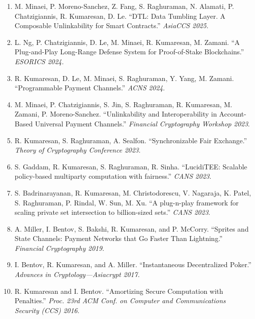 \documentclass[11pt]{article}
\begin{document}
\begin{enumerate}[leftmargin=*, itemsep=1pt]
    \item M. Minaei, P. Moreno-Sanchez, Z. Fang, S. Raghuraman, N. Alamati, P. Chatzigiannis, R. Kumaresan, D. Le. ``DTL: Data Tumbling Layer. A Composable Unlinkability for Smart Contracts.'' \textit{AsiaCCS 2025.}
    
    \item L. Ng, P. Chatzigiannis, D. Le, M. Minaei, R. Kumaresan, M. Zamani. ``A Plug-and-Play Long-Range Defense System for Proof-of-Stake Blockchains.'' \textit{ESORICS 2024.}
    
    \item R. Kumaresan, D. Le, M. Minaei, S. Raghuraman, Y. Yang, M. Zamani. ``Programmable Payment Channels.'' \textit{ACNS 2024}.
    
    \item M. Minaei, P. Chatzigiannis, S. Jin, S. Raghuraman, R. Kumaresan, M. Zamani, P. Moreno-Sanchez. ``Unlinkability and Interoperability in Account-Based Universal Payment Channels.'' \textit{Financial Cryptography Workshop 2023}.
    
    \item R. Kumaresan, S. Raghuraman, A. Sealfon. ``Synchronizable Fair Exchange.'' \textit{Theory of Cryptography Conference 2023}.
    
    \item S. Gaddam, R. Kumaresan, S. Raghuraman, R. Sinha. ``LucidiTEE: Scalable policy-based multiparty computation with fairness.'' \textit{CANS 2023}.
    
    \item S. Badrinarayanan, R. Kumaresan, M. Christodorescu, V. Nagaraja, K. Patel, S. Raghuraman, P. Rindal, W. Sun, M. Xu. ``A plug-n-play framework for scaling private set intersection to billion-sized sets.'' \textit{CANS 2023}.
    
    \item A. Miller, I. Bentov, S. Bakshi, R. Kumaresan, and P. McCorry. ``Sprites and State Channels: Payment Networks that Go Faster Than Lightning.'' \textit{Financial Cryptography 2019.}
    
    \item I. Bentov, R. Kumaresan, and A. Miller. ``Instantaneous Decentralized Poker.'' \textit{Advances in Cryptology—Asiacrypt 2017.}
    
    \item R. Kumaresan and I. Bentov. ``Amortizing Secure Computation with Penalties.'' \textit{Proc. 23rd ACM Conf. on Computer and Communications Security (CCS) 2016}.
    

\end{enumerate}
\end{document}
